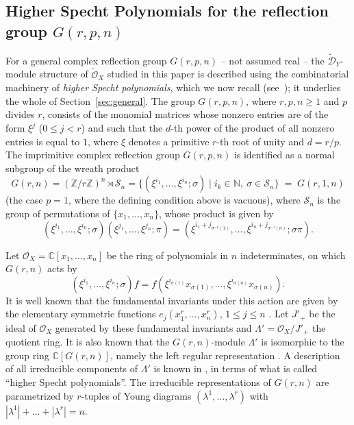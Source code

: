 \documentclass[11pt,a4paper]{article}
\begin{document}
\subsection{Higher Specht Polynomials for the reflection group $G(r,p,n)$}\label{subsec:specht}

For a general complex reflection group $G(r,p,n)$ -- not assumed real
-- the $\widetilde{\mathcal{D}}_Y$-module structure of
$\widetilde{\mathcal{O}}_X$ studied in this paper is described using
the combinatorial machinery of \emph{higher Specht polynomials}, which
we now recall (see~\cite{MoritaYamada1998}); it underlies the whole of
Section~\ref{sec:general}. The group $G(r,p,n)$, where
$r,p,n \ge 1$ and $p$ divides $r$, consists of the monomial matrices
whose nonzero entries are of the form $\xi^j$ ($0 \le j < r$) and such
that the $d$-th power of the product of all nonzero entries is equal
to $1$, where $\xi$ denotes a primitive $r$-th root of unity and
$d = r/p$. The imprimitive complex reflection group $G(r,p,n)$ is
identified as a normal subgroup of the wreath product
\[
  G(r,n) = (\mathbb{Z}/r\mathbb{Z})^n \rtimes \mathcal{S}_n
    = \{ (\xi^{i_1},\dots,\xi^{i_n};\sigma) \mid i_k \in \mathbb{N},\ \sigma \in \mathcal{S}_n \}
  \;=\; G(r,1,n)
\]
(the case $p=1$, where the defining condition above is vacuous), where
$\mathcal{S}_n$ is the group of permutations of
$\{x_1,\dots,x_n\}$, whose product is given by
\[
  (\xi^{i_1},\dots,\xi^{i_n};\sigma)(\xi^{j_1},\dots,\xi^{j_n};\pi)
  = (\xi^{i_1+j_{\sigma^{-1}(1)}},\dots,\xi^{i_n+j_{\sigma^{-1}(n)}};\sigma\pi).
\]

Let $\mathcal{O}_X = \mathbb{C}[x_1,\dots,x_n]$ be the ring of
polynomials in $n$ indeterminates, on which $G(r,n)$ acts by
\[
  (\xi^{i_1},\dots,\xi^{i_n};\sigma) f
  = f(\xi^{i_{\sigma(1)}}x_{\sigma(1)},\dots,\xi^{i_{\sigma(n)}}x_{\sigma(n)}).
\]
It is well known that the fundamental invariants under this action
are given by the elementary symmetric functions
$e_j(x_1^r,\dots,x_n^r)$, $1 \le j \le n$ \cite{ATY1997}. Let $J'_+$
be the ideal of
$\mathcal{O}_X$ generated by these fundamental invariants and
$\Lambda' = \mathcal{O}_X/J'_+$ the quotient ring. It is also known
that the $G(r,n)$-module $\Lambda'$ is isomorphic to the group ring
$\mathbb{C}[G(r,n)]$, namely the left regular representation
\cite{ATY1997}. A
description of all irreducible components of $\Lambda'$ is known in
\cite{ATY1997}, in terms of what is called ``higher Specht
polynomials''. The irreducible representations of $G(r,n)$ are
parametrized by $r$-tuples of Young diagrams $(\lambda^1,\dots,\lambda^r)$
with $|\lambda^1|+\dots+|\lambda^r|=n$.
\end{document}
